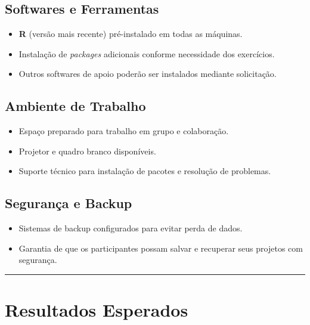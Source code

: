 \documentclass[
  letterpaper,
  DIV=11,
  numbers=noendperiod]{scrreprt}
\providecommand{\tightlist}{%
  \setlength{\itemsep}{0pt}\setlength{\parskip}{0pt}}
\begin{document}
\subsection{Softwares e Ferramentas}\label{softwares-e-ferramentas}

\begin{itemize}
\tightlist
\item
  \textbf{R} (versão mais recente) pré-instalado em todas as máquinas.\\
\item
  Instalação de \emph{packages} adicionais conforme necessidade dos
  exercícios.\\
\item
  Outros softwares de apoio poderão ser instalados mediante solicitação.
\end{itemize}

\subsection{Ambiente de Trabalho}\label{ambiente-de-trabalho}

\begin{itemize}
\tightlist
\item
  Espaço preparado para trabalho em grupo e colaboração.\\
\item
  Projetor e quadro branco disponíveis.\\
\item
  Suporte técnico para instalação de pacotes e resolução de problemas.
\end{itemize}

\subsection{Segurança e Backup}\label{seguranuxe7a-e-backup}

\begin{itemize}
\tightlist
\item
  Sistemas de backup configurados para evitar perda de dados.\\
\item
  Garantia de que os participantes possam salvar e recuperar seus
  projetos com segurança.
\end{itemize}

\begin{center}\rule{0.5\linewidth}{0.5pt}\end{center}

\section{Resultados Esperados}\label{resultados-esperados}
\end{document}
